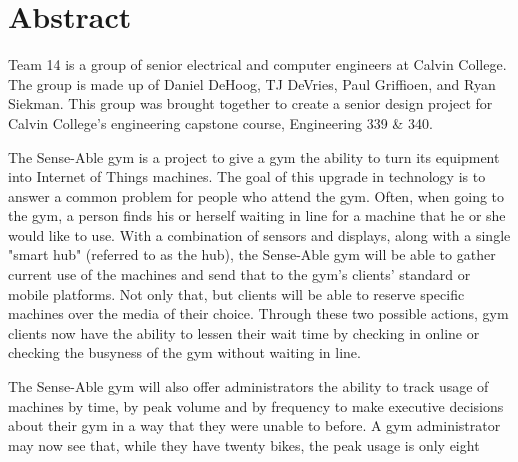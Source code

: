 \documentclass[PPFS.tex]{template/subfiles}
\begin{document}
\section*{Abstract}

Team 14 is a group of senior electrical and computer engineers at Calvin College. The group is made up of Daniel DeHoog, TJ DeVries, Paul Griffioen, and Ryan Siekman. This group was brought together to create a senior design project for Calvin College's engineering capstone course, Engineering 339 \& 340.

The Sense-Able gym is a project to give a gym the ability to turn its equipment into Internet of Things machines. The goal of this upgrade in technology is to answer a common problem for people who attend the gym. Often,  when going to the gym, a person finds his or herself  waiting in line for a machine that he or she would like to use.  With a combination of sensors and displays, along with a single
"smart hub" (referred to as the hub), the Sense-Able gym will be able to gather current use of the machines and send that to the gym's clients' standard or mobile platforms. Not only that, but clients will be able to reserve specific machines over the media of their choice. Through these two possible actions, gym clients now have the ability to lessen their wait time by checking in online or checking the busyness of the gym without waiting in line.

The Sense-Able gym will also offer administrators the ability to track usage of machines by time, by peak volume and by frequency to make executive decisions about their gym in a way that they were unable to before. A gym administrator may now see that, while they have twenty bikes, the peak usage is only eight
\end{document}
